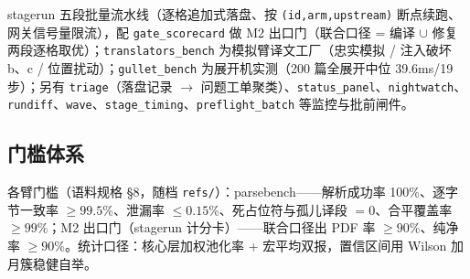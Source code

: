 stagerun 五段批量流水线（逐格追加式落盘、按 \texttt{(id,arm,upstream)} 断点续跑、网关信号量限流），配 \texttt{gate\_scorecard} 做 M2 出口门（联合口径 = 编译 $\cup$ 修复两段逐格取优）；\texttt{translators\_bench} 为模拟臂译文工厂（忠实模拟 / 注入破坏 b、c / 位置扰动）；\texttt{gullet\_bench} 为展开机实测（200 篇全展开中位 39.6ms/19 步）；另有 \texttt{triage}（落盘记录 $\to$ 问题工单聚类）、\texttt{status\_panel}、\texttt{nightwatch}、\texttt{rundiff}、\texttt{wave}、\texttt{stage\_timing}、\texttt{preflight\_batch} 等监控与批前闸件。

\subsection{门槛体系}

各臂门槛（语料规格 §8，随档 \texttt{refs/}）：parsebench——解析成功率 100\%、逐字节一致率 $\geq 99.5\%$、泄漏率 $\leq 0.15\%$、死占位符与孤儿译段 $=0$、合平覆盖率 $\geq 99\%$；M2 出口门（stagerun 计分卡）——联合口径出 PDF 率 $\geq 90\%$、纯净率 $\geq 90\%$。统计口径：核心层加权池化率 + 宏平均双报，置信区间用 Wilson 加月簇稳健自举。
